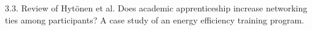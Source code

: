 3.3. Review of Hytönen et al. Does academic apprenticeship increase networking ties among participants? A case study of an energy efficiency training program.